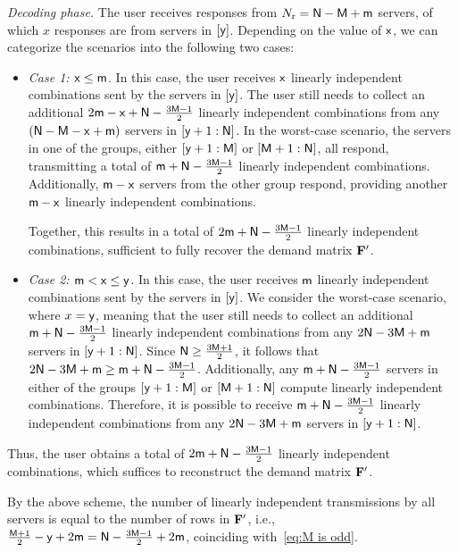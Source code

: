 \documentclass[conference,letterpaper]{IEEEtran}
\begin{document}
  
  {\it Decoding phase.}
The user receives responses from $N_{\rm r} = {\sf N} - {\sf M} + {\sf m}$ servers, of which $x$ responses are from servers in $[{\sf y}]$. Depending on the value of ${\sf x}$, we can categorize the scenarios into the following two cases:
\begin{itemize}
\item {\it Case 1: ${\sf x} \leq {\sf m}$.} In this case, the user receives ${\sf x}$ linearly independent combinations sent by the servers in $[{\sf y}]$. The user still needs to collect an additional $2{\sf m} - {\sf x} + {\sf N} - \frac{3{\sf M} - 1}{2}$ linearly independent combinations from any $({\sf N} - {\sf M} - {\sf x} + {\sf m})$ servers in $[{\sf y} + 1 : {\sf N}]$.
In the worst-case scenario, the servers in one of the groups, either $[{\sf y} + 1 : {\sf M}]$ or $[{\sf M} + 1 : {\sf N}]$, all respond, transmitting a total of ${\sf m} + {\sf N} - \frac{3{\sf M} - 1}{2}$ linearly independent combinations. Additionally, ${\sf m} - {\sf x}$ servers from the other group respond, providing another ${\sf m} - {\sf x}$ linearly independent combinations. 

Together, this results in a total of $2{\sf m} + {\sf N} - \frac{3{\sf M} - 1}{2}$ linearly independent combinations, sufficient to fully recover the demand matrix ${\bf F}'$.

\item {\it Case 2: ${\sf m} < {\sf x} \leq {\sf y}$.} In this case, the user receives ${\sf m}$ linearly independent combinations sent by the servers in $[{\sf y}]$. We consider the worst-case scenario, where $x = {\sf y}$, meaning that the user still needs to collect an additional ${\sf m} + {\sf N} - \frac{3{\sf M} - 1}{2}$ linearly independent combinations from any $2{\sf N} - 3{\sf M} + {\sf m}$ servers in $[{\sf y} + 1 : {\sf N}]$.
Since ${\sf N} \geq \frac{3{\sf M} + 1}{2}$, it follows that $2{\sf N} - 3{\sf M} + {\sf m} \geq {\sf m} + {\sf N} - \frac{3{\sf M} - 1}{2}$. Additionally, any ${\sf m} + {\sf N} - \frac{3{\sf M} - 1}{2}$ servers in either of the groups $[{\sf y} + 1 : {\sf M}]$ or $[{\sf M} + 1 : {\sf N}]$ compute linearly independent combinations. Therefore, it is possible to receive ${\sf m} + {\sf N} - \frac{3{\sf M} - 1}{2}$ linearly independent combinations from any $2{\sf N} - 3{\sf M} + {\sf m}$ servers in $[{\sf y} + 1 : {\sf N}]$.
\end{itemize}
Thus, the user obtains a total of $2{\sf m} + {\sf N} - \frac{3{\sf M} - 1}{2}$ linearly independent combinations, which suffices to reconstruct the demand matrix ${\bf F}'$.

 By the above scheme,  the number of linearly independent transmissions by all servers is equal to the number of rows in ${\bf F}'$, i.e.,
$\frac{{\sf M}+1}{2}-{\sf y}+2{\sf m} ={\sf N}- \frac{3{\sf M}-1}{2}+2{\sf m} $, coinciding with~\eqref{eq:M is odd}.
\end{document}
